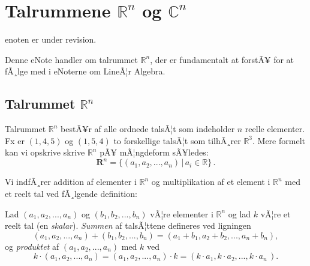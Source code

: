 
\setcounter{chapter}{0} %

\chapter{Talrummene $\mathbb R^n $ og $\mathbb C^n $} \label{tn1}

enoten er under revision.

 

\begin{basis}
Denne eNote handler om talrummet $\mathbb R^n $, der er fundamentalt at forstÃ¥ for at fÃ¸lge med i eNoterne om LineÃ¦r Algebra.
\end{basis}

\section{Talrummet $\mathbb R^n $}

Talrummet $\mathbb R ^n$ bestÃ¥r af alle ordnede talsÃ¦t som indeholder $n$ reelle elementer. Fx er $(1,4,5)$ og $(1,5,4)$ to forskellige talsÃ¦t som tilhÃ¸rer $\mathbb R ^3$. Mere formelt kan vi opskrive skrive $\mathbb R ^n$ pÃ¥ mÃ¦ngdeform sÃ¥ledes:
\begin{equation}\label{eqRn}
\mathbf R ^n=\{(a_1,a_2,...,a_n)\,|\,a_i \in \mathbb R\}\,.
\end{equation}

Vi indfÃ¸rer addition af elementer i $\mathbb R ^n$ og multiplikation af et element i $\mathbb R ^n$ med et reelt tal ved fÃ¸lgende definition:

\begin{definition}\label{tn1.defRegneOP}
Lad $(a_1,a_2,...,a_n)$ og $(b_1,b_2,...,b_n)$ vÃ¦re elementer i $\mathbb R ^n$ og lad $k$ vÃ¦re et reelt tal (en \emph{skalar}).
\textit{Summen} af talsÃ¦ttene defineres ved ligningen
\begin{equation}\label{eqRnSum}
(a_1,a_2,...,a_n)+(b_1,b_2,...,b_n)=(a_1+b_1,a_2+b_2,...,a_n+b_n),
\end{equation}
og \textit{produktet} af $(a_1,a_2,...,a_n)$ med $k$ ved
\begin{equation}\label{eqRnMult}
k\cdot(a_1,a_2,...,a_n)=(a_1,a_2,...,a_n)\cdot k=(k\cdot a_1,k\cdot a_2,...,k\cdot a_n\,).
\end{equation}
\end{definition}

